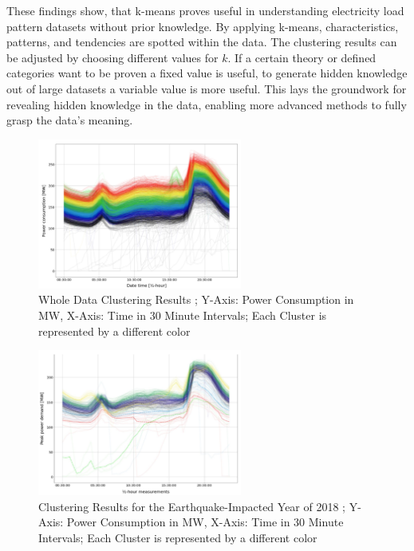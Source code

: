 These findings show, that k-means proves useful in understanding electricity load pattern datasets without prior knowledge.
By applying k-means, characteristics, patterns, and tendencies are spotted within the data.
The clustering results can be adjusted by choosing different values for $k$.
If a certain theory or defined categories want to be proven a fixed value is useful, to generate hidden knowledge out of large datasets a variable value is more useful.
This lays the groundwork for revealing hidden knowledge in the data, enabling more advanced methods to fully grasp the data's meaning.

\begin{figure}
    \centering
    \includegraphics[width=0.6\textwidth]{figures/jessen_ndImpactedClusters/jessen_wholeDataClustering.png}
    \caption{Whole Data Clustering Results \cite{JES-IND};
    Y-Axis: Power Consumption in MW, X-Axis: Time in 30 Minute Intervals;
    Each Cluster is represented by a different color}
    \label{fig:whole_data_clustering_results}
\end{figure}

\begin{figure}
    \centering
    \includegraphics[width=0.6\textwidth]{figures/jessen_ndImpactedClusters/jessen_Clustering2018.png}
    \caption{Clustering Results for the Earthquake-Impacted Year of 2018 \cite{JES-IND};
    Y-Axis: Power Consumption in MW, X-Axis: Time in 30 Minute Intervals;
    Each Cluster is represented by a different color}
    \label{fig:clustering_results_2018}
\end{figure}


